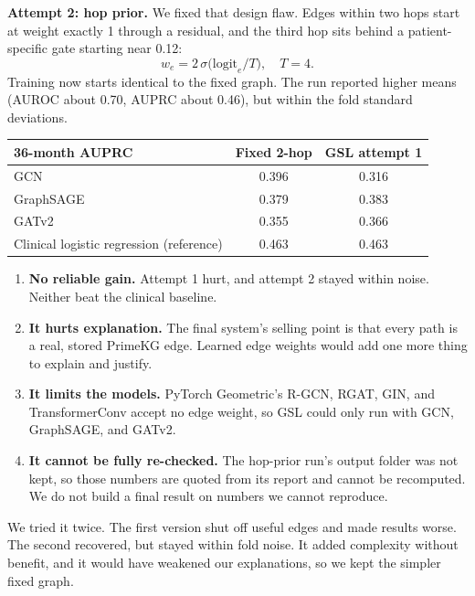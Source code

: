 \documentclass[11pt,a4paper]{article}
\begin{document}
\textbf{Attempt 2: hop prior.} We fixed that design flaw. Edges within two hops start at weight exactly 1 through a residual, and the third hop sits behind a patient-specific gate starting near 0.12:
\begin{equation}
w_e=2\,\sigma\big(\text{logit}_e/T\big),\quad T=4.
\end{equation}
Training now starts identical to the fixed graph. The run reported higher means (AUROC about 0.70, AUPRC about 0.46), but within the fold standard deviations.
\begin{center}
\begin{tabular}{lcc}
\toprule
36-month AUPRC & Fixed 2-hop & GSL attempt 1 \\
\midrule
GCN & 0.396 & 0.316 \\
GraphSAGE & 0.379 & 0.383 \\
GATv2 & 0.355 & 0.366 \\
Clinical logistic regression (reference) & 0.463 & 0.463 \\
\bottomrule
\end{tabular}
\end{center}
\begin{dropbox}
\begin{enumerate}
  \item \textbf{No reliable gain.} Attempt 1 hurt, and attempt 2 stayed within noise. Neither beat the clinical baseline.
  \item \textbf{It hurts explanation.} The final system's selling point is that every path is a real, stored PrimeKG edge. Learned edge weights would add one more thing to explain and justify.
  \item \textbf{It limits the models.} PyTorch Geometric's R-GCN, RGAT, GIN, and TransformerConv accept no edge weight, so GSL could only run with GCN, GraphSAGE, and GATv2.
  \item \textbf{It cannot be fully re-checked.} The hop-prior run's output folder was not kept, so those numbers are quoted from its report and cannot be recomputed. We do not build a final result on numbers we cannot reproduce.
\end{enumerate}
\end{dropbox}
\begin{saybox}
We tried it twice. The first version shut off useful edges and made results worse. The second recovered, but stayed within fold noise. It added complexity without benefit, and it would have weakened our explanations, so we kept the simpler fixed graph.
\end{saybox}
\end{document}
